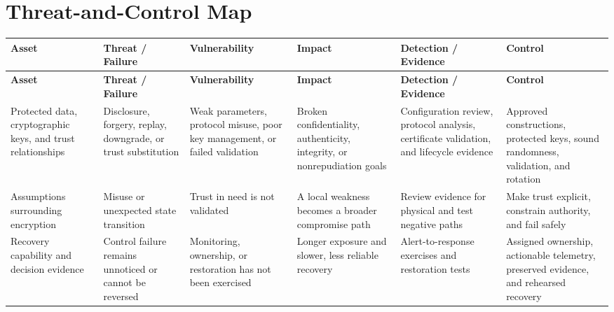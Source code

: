 \documentclass[11pt]{article}
\begin{document}
\section*{Threat-and-Control Map}
\begingroup\scriptsize\setlength{\tabcolsep}{2pt}
\begin{longtable}{>{\RaggedRight\arraybackslash}p{}>{\RaggedRight\arraybackslash}p{}>{\RaggedRight\arraybackslash}p{}>{\RaggedRight\arraybackslash}p{}>{\RaggedRight\arraybackslash}p{}>{\RaggedRight\arraybackslash}p{}}
\toprule\rowcolor{Navy}\color{white}\textbf{Asset} & \color{white}\textbf{Threat / Failure} & \color{white}\textbf{Vulnerability} & \color{white}\textbf{Impact} & \color{white}\textbf{Detection / Evidence} & \color{white}\textbf{Control}\\\midrule
\endfirsthead
\toprule\rowcolor{Navy}\color{white}\textbf{Asset} & \color{white}\textbf{Threat / Failure} & \color{white}\textbf{Vulnerability} & \color{white}\textbf{Impact} & \color{white}\textbf{Detection / Evidence} & \color{white}\textbf{Control}\\\midrule
\endhead
Protected data, cryptographic keys, and trust relationships & Disclosure, forgery, replay, downgrade, or trust substitution & Weak parameters, protocol misuse, poor key management, or failed validation & Broken confidentiality, authenticity, integrity, or nonrepudiation goals & Configuration review, protocol analysis, certificate validation, and lifecycle evidence & Approved constructions, protected keys, sound randomness, validation, and rotation\\\midrule
Assumptions surrounding encryption & Misuse or unexpected state transition & Trust in need is not validated & A local weakness becomes a broader compromise path & Review evidence for physical and test negative paths & Make trust explicit, constrain authority, and fail safely\\\midrule
Recovery capability and decision evidence & Control failure remains unnoticed or cannot be reversed & Monitoring, ownership, or restoration has not been exercised & Longer exposure and slower, less reliable recovery & Alert-to-response exercises and restoration tests & Assigned ownership, actionable telemetry, preserved evidence, and rehearsed recovery\\\midrule
\bottomrule
\end{longtable}
\endgroup
\end{document}
